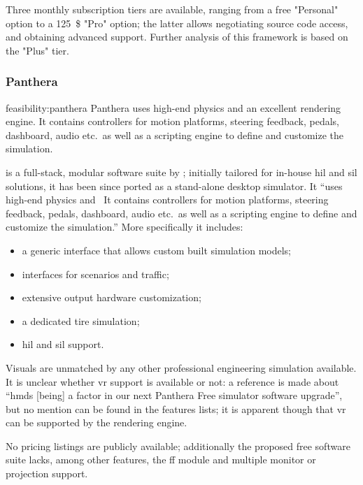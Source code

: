 Three monthly subscription tiers are available, ranging from a free "Personal" option to a \SI{125}{\$} "Pro" option; the latter allows negotiating source code access, and obtaining advanced support. Further analysis of this \gls{framework} is based on the "Plus" tier.

\subsubsection{Panthera}

\begin{excerpt}{feasibility:panthera}
	Panthera uses high-end physics and an excellent rendering engine. It contains controllers for motion platforms, steering feedback, pedals, dashboard, audio etc.\ as well as a scripting engine to define and customize the simulation.
\end{excerpt}

 is a full-stack, modular software suite by ; initially tailored for in-house \gls{hil} and \gls{sil} solutions, it has been since ported as a stand-alone desktop simulator. It \enquote{uses high-end physics and \CHARomissis\ It contains controllers for motion platforms, steering feedback, pedals, dashboard, audio etc.\ as well as a scripting engine to define and customize the simulation.}{\cite{feasibility:panthera}} More specifically it includes:

\begin{itemize}
	\item a generic interface that allows custom built simulation models;
    \item interfaces for scenarios and traffic;
    \item extensive output hardware customization;
    \item a dedicated tire simulation;
    \item \gls{hil} and \gls{sil} support.
\end{itemize}

Visuals are unmatched by any other professional engineering simulation available. It is unclear whether \gls{vr} support is available or not: a reference is made about \enquote{\glspl{hmd} [being] a factor in our next Panthera Free simulator software upgrade}{\cite{feasibility:pantheravr}}, but no mention can be found in the features lists; it is apparent though that \gls{vr} can be supported by the rendering engine.

No pricing listings are publicly available; additionally the proposed free software suite lacks, among other features, the \gls{ff} module and multiple monitor or projection support.

